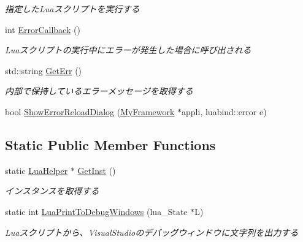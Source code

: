 \begin{DoxyCompactItemize}
\begin{DoxyCompactList}\small\item\em 指定した\+Luaスクリプトを実行する \end{DoxyCompactList}\item 
int \hyperlink{class_lua_helper_adfce384395bce376e1ebb57a849ced5e}{Error\+Callback} ()\hypertarget{class_lua_helper_adfce384395bce376e1ebb57a849ced5e}{}\label{class_lua_helper_adfce384395bce376e1ebb57a849ced5e}

\begin{DoxyCompactList}\small\item\em Luaスクリプトの実行中にエラーが発生した場合に呼び出される \end{DoxyCompactList}\item 
std\+::string \hyperlink{class_lua_helper_a78f86c10afc8de57ba10317599b1a4a6}{Get\+Err} ()\hypertarget{class_lua_helper_a78f86c10afc8de57ba10317599b1a4a6}{}\label{class_lua_helper_a78f86c10afc8de57ba10317599b1a4a6}

\begin{DoxyCompactList}\small\item\em 内部で保持しているエラーメッセージを取得する \end{DoxyCompactList}\item 
bool \hyperlink{class_lua_helper_a18972f326b9a1306513a58fad8dc9384}{Show\+Error\+Reload\+Dialog} (\hyperlink{class_my_framework}{My\+Framework} $\ast$appli, luabind\+::error e)
\end{DoxyCompactItemize}
\subsection*{Static Public Member Functions}
\begin{DoxyCompactItemize}
\item 
static \hyperlink{class_lua_helper}{Lua\+Helper} $\ast$ \hyperlink{class_lua_helper_add03b0c9e9c0f79d00c77fe4b2893fe8}{Get\+Inst} ()\hypertarget{class_lua_helper_add03b0c9e9c0f79d00c77fe4b2893fe8}{}\label{class_lua_helper_add03b0c9e9c0f79d00c77fe4b2893fe8}

\begin{DoxyCompactList}\small\item\em インスタンスを取得する \end{DoxyCompactList}\item 
static int \hyperlink{class_lua_helper_ae251bbc22b4733af2aa5fc28734d51f8}{Lua\+Print\+To\+Debug\+Windows} (lua\+\_\+\+State $\ast$L)\hypertarget{class_lua_helper_ae251bbc22b4733af2aa5fc28734d51f8}{}\label{class_lua_helper_ae251bbc22b4733af2aa5fc28734d51f8}

\begin{DoxyCompactList}\small\item\em Luaスクリプトから、\+Visual\+Studioのデバッグウィンドウに文字列を出力する \end{DoxyCompactList}\end{DoxyCompactItemize}
